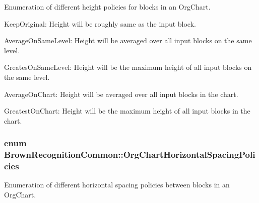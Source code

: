 \-Enumeration of different height policies for blocks in an \-Org\-Chart. 


\begin{DoxyItemize}
\item \-Keep\-Original\-: \-Height will be roughly same as the input block.
\item \-Average\-On\-Same\-Level\-: \-Height will be averaged over all input blocks on the same level.
\item \-Greates\-On\-Same\-Level\-: \-Height will be the maximum height of all input blocks on the same level.
\item \-Average\-On\-Chart\-: \-Height will be averaged over all input blocks in the chart.
\item \-Greatest\-On\-Chart\-: \-Height will be the maximum height of all input blocks in the chart. 
\end{DoxyItemize}\hypertarget{namespace_brown_recognition_common_ac84ab02b07772204f06e83ed86500823}{
\subsubsection[{\-Org\-Chart\-Horizontal\-Spacing\-Policies}]{\setlength{\rightskip}{0pt plus 5cm}enum {\bf \-Brown\-Recognition\-Common\-::\-Org\-Chart\-Horizontal\-Spacing\-Policies}}}
\label{namespace_brown_recognition_common_ac84ab02b07772204f06e83ed86500823}


\-Enumeration of different horizontal spacing policies between blocks in an \-Org\-Chart. 


